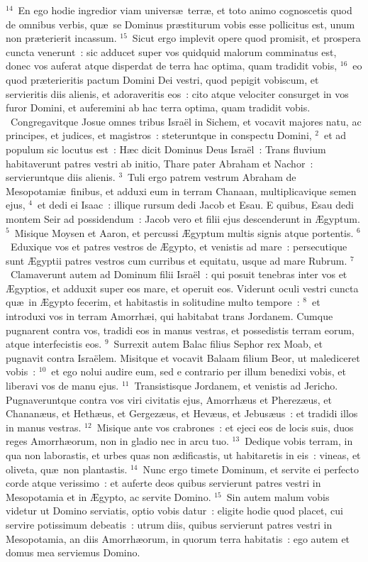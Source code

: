 ${}^{14}$~En ego hodie ingredior viam univers\ae\ terr\ae , et toto animo cognoscetis quod de omnibus verbis, qu\ae\ se Dominus pr\ae stiturum vobis esse pollicitus est, unum non pr\ae terierit incassum.
${}^{15}$~Sicut ergo implevit opere quod promisit, et prospera cuncta venerunt~: sic adducet super vos quidquid malorum comminatus est, donec vos auferat atque disperdat de terra hac optima, quam tradidit vobis,
${}^{16}$~eo quod pr\ae terieritis pactum Domini Dei vestri, quod pepigit vobiscum, et servieritis diis alienis, et adoraveritis eos~: cito atque velociter consurget in vos furor Domini, et auferemini ab hac terra optima, quam tradidit vobis.
~\lettrine[lines=10,image=true,loversize=0.05,lraise=-0.03]{C}{}ongregavitque Josue omnes tribus Isra\"el in Sichem, et vocavit majores natu, ac principes, et judices, et magistros~: steteruntque in conspectu Domini,
${}^{2}$~et ad populum sic locutus est~: H\ae c dicit Dominus Deus Isra\"el~: Trans fluvium habitaverunt patres vestri ab initio, Thare pater Abraham et Nachor~: servieruntque diis alienis.
${}^{3}$~Tuli ergo patrem vestrum Abraham de Mesopotami\ae\ finibus, et adduxi eum in terram Chanaan, multiplicavique semen ejus,
${}^{4}$~et dedi ei Isaac~: illique rursum dedi Jacob et Esau. E quibus, Esau dedi montem Seir ad possidendum~: Jacob vero et filii ejus descenderunt in \AE gyptum.
${}^{5}$~Misique Moysen et Aaron, et percussi \AE gyptum multis signis atque portentis.
${}^{6}$~Eduxique vos et patres vestros de \AE gypto, et venistis ad mare~: persecutique sunt \AE gyptii patres vestros cum curribus et equitatu, usque ad mare Rubrum.
${}^{7}$~Clamaverunt autem ad Dominum filii Isra\"el~: qui posuit tenebras inter vos et \AE gyptios, et adduxit super eos mare, et operuit eos. Viderunt oculi vestri cuncta qu\ae\ in \AE gypto fecerim, et habitastis in solitudine multo tempore~:
${}^{8}$~et introduxi vos in terram Amorrh\ae i, qui habitabat trans Jordanem. Cumque pugnarent contra vos, tradidi eos in manus vestras, et possedistis terram eorum, atque interfecistis eos.
${}^{9}$~Surrexit autem Balac filius Sephor rex Moab, et pugnavit contra Isra\"elem. Misitque et vocavit Balaam filium Beor, ut malediceret vobis~:
${}^{10}$~et ego nolui audire eum, sed e contrario per illum benedixi vobis, et liberavi vos de manu ejus.
${}^{11}$~Transistisque Jordanem, et venistis ad Jericho. Pugnaveruntque contra vos viri civitatis ejus, Amorrh\ae us et Pherez\ae us, et Chanan\ae us, et Heth\ae us, et Gergez\ae us, et Hev\ae us, et Jebus\ae us~: et tradidi illos in manus vestras.
${}^{12}$~Misique ante vos crabrones~: et ejeci eos de locis suis, duos reges Amorrh\ae orum, non in gladio nec in arcu tuo.
${}^{13}$~Dedique vobis terram, in qua non laborastis, et urbes quas non \ae dificastis, ut habitaretis in eis~: vineas, et oliveta, qu\ae\ non plantastis.
${}^{14}$~Nunc ergo timete Dominum, et servite ei perfecto corde atque verissimo~: et auferte deos quibus servierunt patres vestri in Mesopotamia et in \AE gypto, ac servite Domino.
${}^{15}$~Sin autem malum vobis videtur ut Domino serviatis, optio vobis datur~: eligite hodie quod placet, cui servire potissimum debeatis~: utrum diis, quibus servierunt patres vestri in Mesopotamia, an diis Amorrh\ae orum, in quorum terra habitatis~: ego autem et domus mea serviemus Domino.


